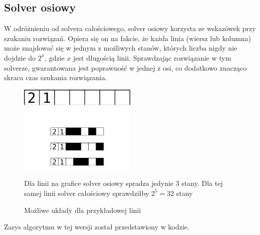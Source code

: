 \subsection{Solver osiowy}
    W odróżnieniu od solvera całościowego, solver osiowy korzysta ze wskazówek przy szukaniu rozwiązań.
Opiera się on na fakcie, że każda linia (wiersz lub kolumna) może znajdować się w jednym z możliwych
stanów, których liczba nigdy nie dojdzie do $2^x$, gdzie $x$ jest długością linii. Sprawdzając
rozwiązanie w tym solverze, gwarantowana jest poprawność w jednej z osi, co dodatkowo znacząco skraca
czas szukania rozwiązania.

\begin{figure}[!htb]
    \centering
    \includegraphics[width=0.5\textwidth]{images/axis_solver_example.png}
    \caption{Możliwe układy dla przykładowej linii}
    Dla linii na grafice solver osiowy spradza jedynie 3 stany. Dla tej samej linii
solver całościowy sprawdziłby $2^5 = 32$ stany
\end{figure}

    Zarys algorytmu w tej wersji został przedstawiony w kodzie.

\begin{pseudokod}[H]
    \caption{SolverOsiowy}\label{alg:axisSolver}
\end{pseudokod}

